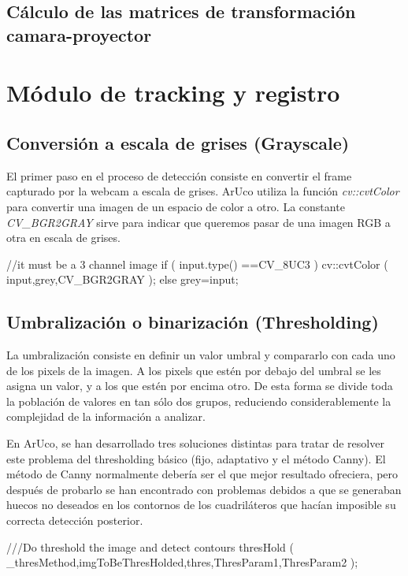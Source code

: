 \subsection{Cálculo de las matrices de transformación camara-proyector}


\section{Módulo de tracking y registro}

\subsection{Conversión a escala de grises (Grayscale)}
El primer paso en el proceso de detección consiste en convertir el frame capturado por la webcam a escala de grises. ArUco utiliza la función \textit{cv::cvtColor} para convertir una imagen de un espacio de color a otro.  La constante \textit{CV\_BGR2GRAY} sirve para indicar que queremos pasar de una imagen RGB a otra en escala de grises.

\begin{listing}[style=C++]
 //it must be a 3 channel image
    if ( input.type() ==CV_8UC3 )   cv::cvtColor ( input,grey,CV_BGR2GRAY );
    else     grey=input;
\end{listing}

\subsection{Umbralización o binarización (Thresholding)}
La umbralización consiste en definir un valor umbral y compararlo con cada uno de los pixels de la imagen. A los pixels que estén por debajo del umbral se les asigna un valor, y a los que estén por encima otro. De esta forma se divide toda la población de valores en tan sólo dos grupos, reduciendo considerablemente la complejidad de la información a analizar.

En ArUco, se han desarrollado tres soluciones distintas para tratar de resolver este problema del thresholding básico (fijo, adaptativo y el método Canny). El método de Canny normalmente debería ser el que mejor resultado ofreciera, pero después de probarlo se han encontrado con problemas debidos a que se generaban huecos no deseados en los contornos de los cuadriláteros que hacían imposible su correcta detección posterior.

\begin{listing}[style=C++]
  ///Do threshold the image and detect contours
    thresHold ( _thresMethod,imgToBeThresHolded,thres,ThresParam1,ThresParam2 );
\end{listing} 

